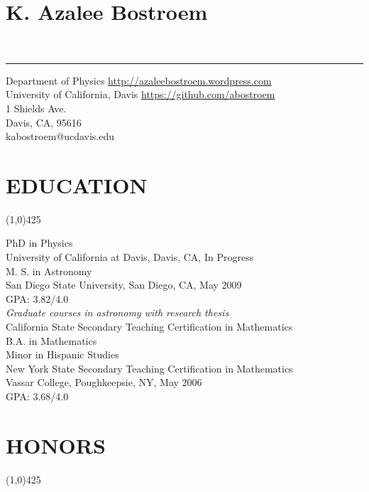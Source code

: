 \documentclass{res}
\begin{document}
 

\section{{\LARGE \bf{K. Azalee Bostroem}}}\\
{\rule{\linewidth}{0.5mm}}
Department of Physics \hfill {\color{blue}\url{http://azaleebostroem.wordpress.com}}\\
University of California, Davis \hfill {\color{blue}\url{https://github.com/abostroem} }\\
1 Shields Ave. \\
Davis, CA, 95616 \\
kabostroem@ucdavis.edu

\begin{resume}

\section{EDUCATION}
\vspace{-.2in} 
\begin{center}
\line(1,0){425}
\end{center}
\vspace{-.3in} 
\vspace{0.1in} 
 
   PhD in Physics \\
   University of California at Davis, Davis, CA, In Progress \\
 
    M. S. in Astronomy \\
    San Diego State University, San Diego, CA, May 2009 \\
    GPA: 3.82/4.0 \\
    \emph{Graduate courses in astronomy with research thesis} \\
    
    California State Secondary Teaching Certification in Mathematics \\
 
    B.A. in Mathematics \\
    Minor in Hispanic Studies \\
    New York State Secondary Teaching Certification in Mathematics \\
    Vassar College, Poughkeepsie, NY, May 2006\\
    GPA: 3.68/4.0   
 
\section{HONORS}
\vspace{-.2in} 
\begin{center}
\line(1,0){425}
\end{center}
\vspace{-.3in} 
\vspace{0.1in} 


\end{resume}
\end{document}
